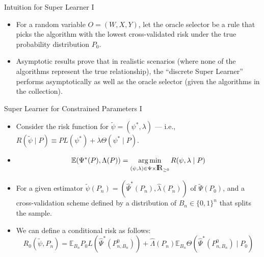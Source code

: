 \documentclass[12pt,t]{beamer}
\newcommand{\E}{\mathbb{E}}
\DeclareMathOperator*{\argmin}{arg\,min}
\newcommand{\openr}{\hbox{${\rm I\kern-.2em R}$}}
\begin{document}

\begin{frame}[c]{Intuition for Super Learner I}

\begin{center}
\begin{itemize}
  \itemsep12pt
  \item For a random variable $O = (W,X,Y)$, let the oracle selector be a rule
    that picks the algorithm with the lowest cross-validated risk under the true
    probability distribution $P_0$.
  \item Asymptotic results prove that in realistic scenarios (where none of the
    algorithms represent the true relationship), the ``discrete Super Learner''
    performs asymptotically as well as the oracle selector (given the algorithms
    in the collection).
\end{itemize}
\end{center}

\note{
}

\end{frame}


\begin{frame}[c]{Super Learner for Constrained Parameters I}

\begin{center}
\begin{itemize}
  \itemsep12pt
  \item Consider the risk function for $\widetilde{\psi} = (\psi^*, \lambda)$
    --- i.e., $R(\tilde{\psi} \mid P) \equiv PL(\psi^*) + \lambda \Theta(\psi^*
    \mid P)$.
  \item $$\E(\Psi^*(P), \Lambda(P)) = \argmin_{(\psi, \lambda) \in \Psi
      \times \openr_{\geq 0}}R(\psi, \lambda \mid P)$$
  \item For a given estimator $\widetilde{\psi}(P_n) = (\hat{\Psi}^*(P_n),
    \hat{\lambda}(P_n))$ of $\widetilde{\Psi}(P_0)$, and a cross-validation
    scheme defined by a distribution of $B_n \in \{0, 1\}^n$ that splits the
    sample.
  \item We can define a conditional risk as follows:
    $$R_0(\widetilde{\psi}, P_n) = \E_{B_n} P_0L(\hat{\Psi}^*(P_{n, B_n}^0)) +
      \hat{\Lambda}(P_n) \E_{B_n} \Theta(\hat{\Psi}^*(P_{n, B_n}^0) \mid P_0)$$
\end{itemize}
\end{center}


\end{frame}
\end{document}
